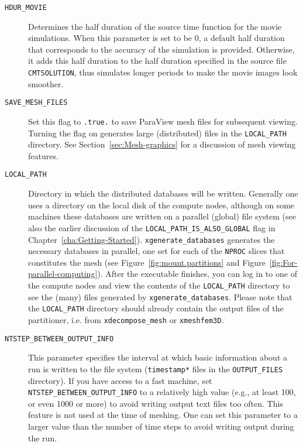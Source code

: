 \begin{description}
\item [{\texttt{HDUR\_MOVIE}}] Determines the half duration of the source
time function for the movie simulations. When this parameter is set
to be 0, a default half duration that corresponds to the accuracy
of the simulation is provided. Otherwise, it adds this half duration
to the half duration specified in the source file \texttt{CMTSOLUTION},
thus simulates longer periods to make the movie images look smoother.
\item [{\texttt{SAVE\_MESH\_FILES}}] Set this flag to \texttt{.true.} to
save ParaView  mesh files for
subsequent viewing. Turning the flag on generates large (distributed)
files in the \texttt{LOCAL\_PATH} directory. See Section~\ref{sec:Mesh-graphics}
for a discussion of mesh viewing features.
\item [{\texttt{LOCAL\_PATH}}] Directory in which the distributed databases
will be written. Generally one uses a directory on the local disk
of the compute nodes, although on some machines these databases are
written on a parallel (global) file system (see also the earlier discussion
of the \texttt{LOCAL\_PATH\_IS\_ALSO\_GLOBAL} flag in Chapter~\ref{cha:Getting-Started}).
\texttt{xgenerate\_databases} generates the necessary databases in
parallel, one set for each of the \texttt{NPROC} slices that constitutes
the mesh (see Figure~\ref{fig:mount.partitions} and Figure~\ref{fig:For-parallel-computing}).
After the executable finishes, you can log in to one of the compute
nodes and view the contents of the \texttt{LOCAL\_PATH} directory
to see the (many) files generated by \texttt{xgenerate\_databases}.
Please note that the \texttt{LOCAL\_PATH} directory should already
contain the output files of the partitioner, i.e. from \texttt{xdecompose\_mesh}
or \texttt{xmeshfem3D}.
\item [{\texttt{NTSTEP\_BETWEEN\_OUTPUT\_INFO}}] This parameter specifies
the interval at which basic information about a run is written to
the file system (\texttt{timestamp{*}} files in the \texttt{OUTPUT\_FILES}
directory). If you have access to a fast machine, set \texttt{NTSTEP\_BETWEEN\_OUTPUT\_INFO}
to a relatively high value (e.g., at least 100, or even 1000 or more)
to avoid writing output text files too often. This feature is not
used at the time of meshing. One can set this parameter to a larger
value than the number of time steps to avoid writing output during
the run.
\end{description}

